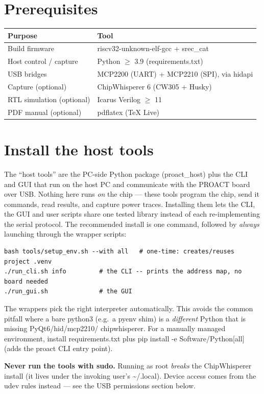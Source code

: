 \documentclass[11pt,a4paper]{report}
\newcommand{\code}[1]{{\ttfamily\small #1}}
\begin{document}
\section{Prerequisites}
\begin{center}
\begin{tabular}{p{5cm}p{9cm}}
\toprule
\textbf{Purpose} & \textbf{Tool} \\ \midrule
Build firmware & \code{riscv32-unknown-elf-gcc} + \code{srec\_cat} \\
Host control / capture & Python $\geq$ 3.9 (\code{requirements.txt}) \\
USB bridges & MCP2200 (UART) + MCP2210 (SPI), via \code{hidapi} \\
Capture (optional) & ChipWhisperer 6 (CW305 + Husky) \\
RTL simulation (optional) & Icarus Verilog $\geq$ 11 \\
PDF manual (optional) & \code{pdflatex} (TeX Live) \\
\bottomrule
\end{tabular}\end{center}

\section{Install the host tools}
The ``host tools'' are the PC-side Python package
(\code{proact\_host}) plus the CLI and GUI that run on the host PC
and communicate with the PROACT board over USB. Nothing here runs \emph{on} the
chip --- these tools program the chip, send it commands, read results,
and capture power traces. Installing them lets the CLI, the GUI and user
scripts share one tested library instead of each re-implementing the serial
protocol. The recommended install is one command, followed by \emph{always}
launching through the wrapper scripts:
\begin{lstlisting}[style=sh]
bash tools/setup_env.sh --with all   # one-time: creates/reuses project .venv
./run_cli.sh info         # the CLI -- prints the address map, no board needed
./run_gui.sh              # the GUI
\end{lstlisting}
The wrappers pick the right interpreter automatically. This avoids the common
pitfall where a bare \code{python3} (e.g.\ a pyenv shim) is a \emph{different}
Python that is missing \code{PyQt6}/\code{hid}/\code{mcp2210}/%
\code{chipwhisperer}. For a manually managed environment, install
\code{requirements.txt} plus \code{pip install -e Software/Python[all]} (adds
the \code{proact} CLI entry point).
\begin{warnbox}
\textbf{Never run the tools with \code{sudo}.} Running as root \emph{breaks} the
ChipWhisperer install (it lives under the invoking user's \code{\~{}/.local}).
Device access comes from the udev rules instead --- see the USB permissions
section below.
\end{warnbox}
\end{document}
